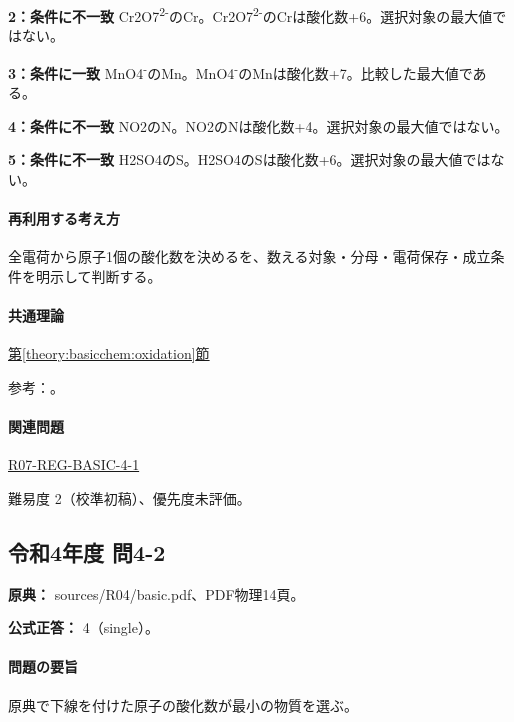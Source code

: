 \noindent\textbf{2：条件に不一致} Cr2O7\textsuperscript{2-}のCr。Cr2O7\textsuperscript{2-}のCrは酸化数+6。選択対象の最大値ではない。\par

\noindent\textbf{3：条件に一致} MnO4\textsuperscript{-}のMn。MnO4\textsuperscript{-}のMnは酸化数+7。比較した最大値である。\par

\noindent\textbf{4：条件に不一致} NO2のN。NO2のNは酸化数+4。選択対象の最大値ではない。\par

\noindent\textbf{5：条件に不一致} H2SO4のS。H2SO4のSは酸化数+6。選択対象の最大値ではない。\par

\paragraph{再利用する考え方} 全電荷から原子1個の酸化数を決めるを、数える対象・分母・電荷保存・成立条件を明示して判断する。

\paragraph{共通理論} \hyperref[theory:basicchem:oxidation]{第\ref*{theory:basicchem:oxidation}節}

\par 参考：\cite{iupac_oxidation_state}。

\paragraph{関連問題} \hyperref[q:r07-reg-basic-4-1]{R07-REG-BASIC-4-1}

\par 難易度 2（校準初稿）、優先度未評価。

\subsection{令和4年度 問4-2}
\label{q:r04-reg-basic-4-2}

\noindent\textbf{原典：} sources/R04/basic.pdf、PDF物理14頁。

\textbf{公式正答：} 4（single）。

\paragraph{問題の要旨} 原典で下線を付けた原子の酸化数が最小の物質を選ぶ。

